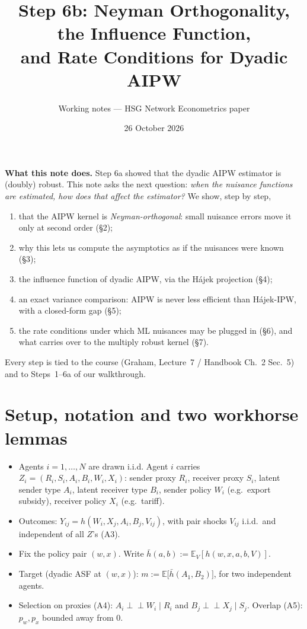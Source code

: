 \documentclass[11pt,a4paper]{article}
\title{\textbf{Step 6b: Neyman Orthogonality, the Influence Function,\\ and Rate Conditions for Dyadic AIPW}}
\author{Working notes --- HSG Network Econometrics paper}
\date{26 October 2026}
\theoremstyle{remark}
\newcommand{\E}{\mathbb{E}}
\newcommand{\1}{\mathbf{1}}
\newcommand{\ind}{\perp\!\!\!\perp}
\begin{document}
\maketitle

\noindent\textbf{What this note does.} Step 6a showed that the dyadic AIPW estimator is (doubly) robust.
This note asks the next question: \emph{when the nuisance functions are estimated, how does that affect the estimator?}
We show, step by step,
\begin{enumerate}[nosep]
  \item that the AIPW kernel is \emph{Neyman-orthogonal}: small nuisance errors move it only at second order (\S2);
  \item why this lets us compute the asymptotics as if the nuisances were known (\S3);
  \item the influence function of dyadic AIPW, via the Hájek projection (\S4);
  \item an exact variance comparison: AIPW is never less efficient than Hájek-IPW, with a closed-form gap (\S5);
  \item the rate conditions under which ML nuisances may be plugged in (\S6), and what carries over to the multiply robust kernel (\S7).
\end{enumerate}
Every step is tied to the course (Graham, Lecture~7 / Handbook Ch.~2 Sec.~5) and to Steps~1--6a of our walkthrough.

\section{Setup, notation and two workhorse lemmas}

\begin{setupbox}
\begin{itemize}[leftmargin=*,nosep]
  \item Agents $i=1,\dots,N$ are drawn i.i.d. Agent $i$ carries
  $Z_i=(R_i,S_i,A_i,B_i,W_i,X_i)$: sender proxy $R_i$, receiver proxy $S_i$, latent sender type $A_i$,
  latent receiver type $B_i$, sender policy $W_i$ (e.g.\ export subsidy), receiver policy $X_i$ (e.g.\ tariff).
  \item Outcomes: $Y_{ij}=h(W_i,X_j,A_i,B_j,V_{ij})$, with pair shocks $V_{ij}$ i.i.d.\ and independent of all $Z$'s (A3).
  \item Fix the policy pair $(w,x)$. Write $\bar h(a,b):=\E_V[h(w,x,a,b,V)]$.
  \item Target (dyadic ASF at $(w,x)$): $m:=\E\big[\bar h(A_1,B_2)\big]$, for two independent agents.
  \item Selection on proxies (A4): $A_i\ind W_i\mid R_i$ and $B_j\ind X_j\mid S_j$. Overlap (A5): $p_w,p_x$ bounded away from $0$.
\end{itemize}
\end{setupbox}
\end{document}
